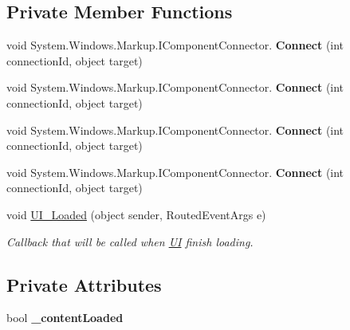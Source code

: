 \subsection*{Private Member Functions}
\begin{DoxyCompactItemize}
\item 
\mbox{\label{class_wpf_handler_1_1_u_i_1_1_controls_1_1_selectable_flat_button_a0641902352c955ea46db0fa88c073006}} 
void System.\+Windows.\+Markup.\+I\+Component\+Connector. {\bfseries Connect} (int connection\+Id, object target)
\item 
\mbox{\label{class_wpf_handler_1_1_u_i_1_1_controls_1_1_selectable_flat_button_a0641902352c955ea46db0fa88c073006}} 
void System.\+Windows.\+Markup.\+I\+Component\+Connector. {\bfseries Connect} (int connection\+Id, object target)
\item 
\mbox{\label{class_wpf_handler_1_1_u_i_1_1_controls_1_1_selectable_flat_button_a0641902352c955ea46db0fa88c073006}} 
void System.\+Windows.\+Markup.\+I\+Component\+Connector. {\bfseries Connect} (int connection\+Id, object target)
\item 
\mbox{\label{class_wpf_handler_1_1_u_i_1_1_controls_1_1_selectable_flat_button_a0641902352c955ea46db0fa88c073006}} 
void System.\+Windows.\+Markup.\+I\+Component\+Connector. {\bfseries Connect} (int connection\+Id, object target)
\item 
void \mbox{\hyperlink{class_wpf_handler_1_1_u_i_1_1_controls_1_1_selectable_flat_button_adeb088033184dde922518f7a7f577fa1}{U\+I\+\_\+\+Loaded}} (object sender, Routed\+Event\+Args e)
\begin{DoxyCompactList}\small\item\em Callback that will be called when \mbox{\hyperlink{namespace_wpf_handler_1_1_u_i}{UI}} finish loading. \end{DoxyCompactList}\end{DoxyCompactItemize}
\subsection*{Private Attributes}
\begin{DoxyCompactItemize}
\item 
\mbox{\label{class_wpf_handler_1_1_u_i_1_1_controls_1_1_selectable_flat_button_a2b5a1d08aec8c16088a106dad5fc4ed4}} 
bool {\bfseries \+\_\+content\+Loaded}
\end{DoxyCompactItemize}
